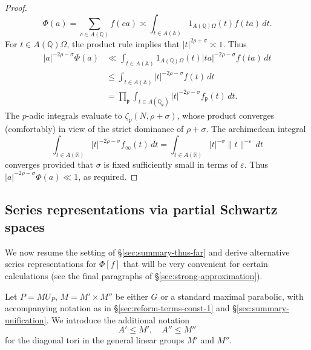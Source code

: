 \documentclass[reqno]{amsart}
\def\eps{\varepsilon}
\theoremstyle{plain} \newtheorem{theorem} {Theorem}
\theoremstyle{definition} \newtheorem{definition} [theorem] {Definition}
\theoremstyle{itplain} %
\numberwithin{equation}{section}
\numberwithin{theorem}{section}
\renewcommand{\leq}{\leqslant}
\begin{document}
\begin{proof}
  \begin{equation*}
    \Phi(a) = \sum _{c \in A(\mathbb{Q})} f(c a) \asymp  \int _{t \in A(\mathbb{A})}  1_{A(\mathbb{Q}) \Omega}(t) f(t a) \, d t.
  \end{equation*}
  For $t \in A(\mathbb{Q}) \Omega$, the product rule implies that $|t|^{2 \rho + \sigma} \asymp 1$.  Thus
  \begin{align*}
    |a|^{-2 \rho-\sigma} \Phi(a)
    &\ll \int _{t \in A(\mathbb{A})} 1_{A(\mathbb{Q}) \Omega}(t) |t a|^{-2 \rho - \sigma} f(t a) \, d t \\
    &\leq \int _{t \in A(\mathbb{A})} |t|^{-2 \rho - \sigma} f(t) \, d t \\
    &= \prod_\mathfrak{p} \int _{t \in A(\mathbb{Q}_\mathfrak{p})} |t|^{-2 \rho - \sigma} f_\mathfrak{p}(t) \, d t.
  \end{align*}
  The $p$-adic integrals evaluate to $\zeta_p(N,\rho + \sigma)$, whose product converges (comfortably) in view of the strict dominance of $\rho + \sigma$.  The archimedean integral
  \begin{equation*}
    \int _{t \in A(\mathbb{R})} |t|^{- 2 \rho - \sigma} f_\infty(t) \, d t
    =
    \int _{t \in A(\mathbb{R})} |t|^{- \sigma} \|t\|^{-\eps} \, d t
  \end{equation*}
  converges provided that $\sigma$ is fixed sufficiently small in terms of $\eps$.  Thus $|a|^{- 2 \rho - \sigma} \Phi(a) \ll 1$, as required.
\end{proof}




\subsection{Series representations via partial Schwartz spaces}\label{sec:seri-repr-via}
We now resume the setting of \S\ref{sec:summary-thus-far} and derive alternative series representations for $\Phi[f]$ that will be very convenient for certain calculations (see the final paragraphs of \S\ref{sec:strong-approximation}).

Let $P = M {U_P}$, $M = M' \times M''$ be either $G$ or a standard maximal parabolic, with accompanying notation as in \S\ref{sec:reform-terms-const-1} and \S\ref{sec:summary-unification}.  We introduce the additional notation
\begin{equation*}
  A' \leq M', \quad A'' \leq M''
\end{equation*}
for the diagonal tori in the general linear groups $M'$ and $M''$.
\end{document}
